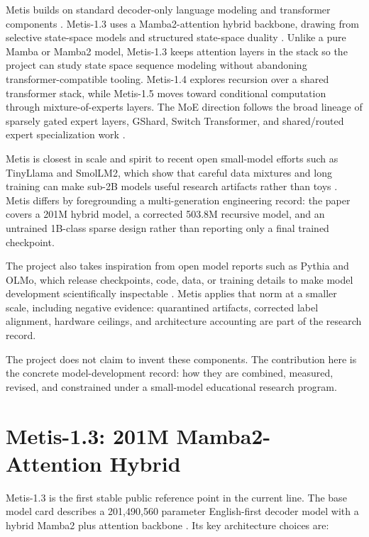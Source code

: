 \documentclass[11pt]{article}
\begin{document}
Metis builds on standard decoder-only language modeling and transformer
components \cite{vaswani2017attention}. Metis-1.3 uses a Mamba2-attention hybrid
backbone, drawing from selective state-space models and structured state-space
duality \cite{gu2023mamba,dao2024mamba2}. Unlike a pure Mamba or Mamba2 model,
Metis-1.3 keeps attention layers in the stack so the project can study state
space sequence modeling without abandoning transformer-compatible tooling.
Metis-1.4 explores recursion over a shared transformer stack, while Metis-1.5
moves toward conditional computation through mixture-of-experts layers. The MoE
direction follows the broad lineage of sparsely gated expert layers, GShard,
Switch Transformer, and shared/routed expert specialization work
\cite{shazeer2017outrageously,lepikhin2020gshard,fedus2021switch,dai2024deepseekmoe}.

Metis is closest in scale and spirit to recent open small-model efforts such as
TinyLlama and SmolLM2, which show that careful data mixtures and long training
can make sub-2B models useful research artifacts rather than toys
\cite{zhang2024tinyllama,allal2025smollm2}. Metis differs by foregrounding a
multi-generation engineering record: the paper covers a 201M hybrid model, a
corrected 503.8M recursive model, and an untrained 1B-class sparse design rather
than reporting only a final trained checkpoint.

The project also takes inspiration from open model reports such as Pythia and
OLMo, which release checkpoints, code, data, or training details to make model
development scientifically inspectable \cite{biderman2023pythia,groeneveld2024olmo}.
Metis applies that norm at a smaller scale, including negative evidence:
quarantined artifacts, corrected label alignment, hardware ceilings, and
architecture accounting are part of the research record.

The project does not claim to invent these components. The contribution here is
the concrete model-development record: how they are combined, measured, revised,
and constrained under a small-model educational research program.

\section{Metis-1.3: 201M Mamba2-Attention Hybrid}

Metis-1.3 is the first stable public reference point in the current line. The
base model card describes a 201,490,560 parameter English-first decoder model
with a hybrid Mamba2 plus attention backbone \cite{metis13base}. Its key
architecture choices are:
\end{document}
